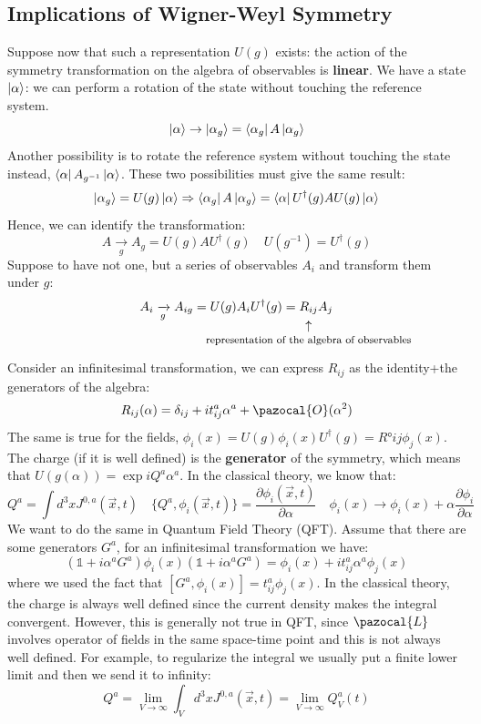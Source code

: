 \documentclass[../main.tex]{subfiles}
\begin{document}
\subsection{Implications of Wigner-Weyl Symmetry}
Suppose now that such a representation $U(g)$ exists: the action of the symmetry transformation on the algebra of observables is \textbf{linear}. We have a state $\ket{\alpha}$: we can perform a rotation of the state without touching the reference system.
\[
\ket{\alpha}\to\ket{\alpha_g}=\bra{\alpha_g}A\ket{\alpha_g}
\]
Another possibility is to rotate the reference system without touching the state instead, $\bra{\alpha}A_{g^{-1}}\ket{\alpha}$. These two possibilities must give the same result:
\[
\ket{\alpha_g}=U(g)\ket{\alpha}\Rightarrow\bra{\alpha_g}A\ket{\alpha_g}=\bra{\alpha}U^\dagger(g)AU(g)\ket{\alpha}
\]
Hence, we can identify the transformation:
\[
A\xrightarrow[g]{}A_g=U(g)AU^\dagger(g)\quad U(g^{-1})=U^\dagger(g)
\]
Suppose to have not one, but a series of observables $A_i$ and transform them under $g$:
\[
A_i\xrightarrow[g]{}A_{ig}=U(g)A_iU^\dagger(g)=\underset{\mathclap{\tikz \node {$\uparrow$} node [below=1ex] {\footnotesize  representation of the algebra of observables};}}{R_{ij}}A_j
\]
Consider an infinitesimal transformation, we can express $R_{ij}$ as the identity+the generators of the algebra:
\[
R_{ij}(\alpha)=\delta_{ij}+it_{ij}^a\alpha^a+\pazocal{O}(\alpha^2)
\]
The same is true for the fields, $\phi_i(x)=U(g)\phi_i(x)U^\dagger(g)=R°{ij}\phi_j(x)$.\\
The charge (if it is well defined) is the \textbf{generator} of the symmetry, which means that $U(g(\alpha))=\exp{iQ^a\alpha^a}$. In the classical theory, we know that:
\[
Q^a=\int d^3xJ^{0,a}(\Vec{x},t) \quad \{Q^a,\phi_i(\Vec{x},t)\}=\frac{\partial\phi_i(\Vec{x},t)}{\partial\alpha} \quad \phi_i(x)\to\phi_i(x)+\alpha\frac{\partial\phi_i}{\partial\alpha}
\]
We want to do the same in Quantum Field Theory (QFT). Assume that there are some generators $G^a$, for an infinitesimal transformation we have:
\[
(\mathbb{1}+i\alpha^aG^a)\phi_i(x)(\mathbb{1}+i\alpha^aG^a)=\phi_i(x)+it_{ij}^a\alpha^a\phi_j(x)
\]
where we used the fact that $[G^a,\phi_i(x)]=t_{ij}^a\phi_j(x)$. In the classical theory, the charge is always well defined since the current density makes the integral convergent. However, this is generally not true in QFT, since $\pazocal{L}$ involves operator of fields in the same space-time point and this is not always well defined. For example, to regularize the integral we usually put a finite lower limit and then we send it to infinity:
\[
Q^a=\lim_{V\to\infty}\int_V d^3xJ^{0,a}(\Vec{x},t)=\lim_{V\to\infty}Q_V^a(t)
\]
\end{document}
